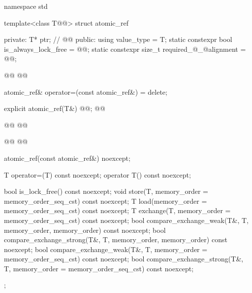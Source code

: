 \begin{codeblock}
namespace std {

  template<class T@@> struct atomic_ref {
  private:
    T* ptr;      // \expos
    @@
  public:
    using value_type = T;
    static constexpr bool is_always_lock_free = @@;
    static constexpr size_t required_@_@alignment = @@;

    @@
    @@

    atomic_ref& operator=(const atomic_ref&) = delete;

    explicit atomic_ref(T&) @@;
    @@
   
    @@
    @@
    
    @@
    @@

    atomic_ref(const atomic_ref&) noexcept;

    T operator=(T) const noexcept;
    operator T() const noexcept;

    bool is_lock_free() const noexcept;
    void store(T, memory_order = memory_order_seq_cst) const noexcept;
    T load(memory_order = memory_order_seq_cst) const noexcept;
    T exchange(T, memory_order = memory_order_seq_cst) const noexcept;
    bool compare_exchange_weak(T&, T,
                               memory_order, memory_order) const noexcept;
    bool compare_exchange_strong(T&, T,
                                 memory_order, memory_order) const noexcept;
    bool compare_exchange_weak(T&, T,
                               memory_order = memory_order_seq_cst) const noexcept;
    bool compare_exchange_strong(T&, T,
                                 memory_order = memory_order_seq_cst) const noexcept;
  };
}
\end{codeblock}
~\\

